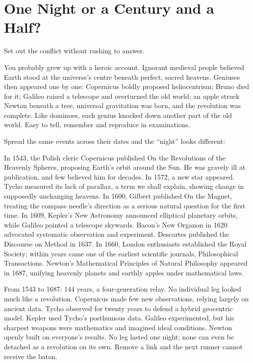 \section{One Night or a Century and a Half?}
Set out the conflict without rushing to answer.

You probably grew up with a heroic account. Ignorant medieval people believed Earth stood at the universe's centre beneath perfect, sacred heavens. Geniuses then appeared one by one: Copernicus boldly proposed heliocentrism; Bruno died for it; Galileo raised a telescope and overturned the old world; an apple struck Newton beneath a tree, universal gravitation was born, and the revolution was complete. Like dominoes, each genius knocked down another part of the old world. Easy to tell, remember and reproduce in examinations.

Spread the same events across their dates and the ``night'' looks different:

In 1543, the Polish cleric Copernicus published On the Revolutions of the Heavenly Spheres, proposing Earth's orbit around the Sun. He was gravely ill at publication, and few believed him for decades. In 1572, a new star appeared. Tycho measured its lack of parallax, a term we shall explain, showing change in supposedly unchanging heavens. In 1600, Gilbert published On the Magnet, treating the compass needle's direction as a serious natural question for the first time. In 1609, Kepler's New Astronomy announced elliptical planetary orbits, while Galileo pointed a telescope skywards. Bacon's New Organon in 1620 advocated systematic observation and experiment. Descartes published the Discourse on Method in 1637. In 1660, London enthusiasts established the Royal Society; within years came one of the earliest scientific journals, Philosophical Transactions. Newton's Mathematical Principles of Natural Philosophy appeared in 1687, unifying heavenly planets and earthly apples under mathematical laws.

From 1543 to 1687: 144 years, a four-generation relay. No individual leg looked much like a revolution. Copernicus made few new observations, relying largely on ancient data. Tycho observed for twenty years to defend a hybrid geocentric model. Kepler used Tycho's posthumous data. Galileo experimented, but his sharpest weapons were mathematics and imagined ideal conditions. Newton openly built on everyone's results. No leg lasted one night; none can even be detached as a revolution on its own. Remove a link and the next runner cannot receive the baton.

